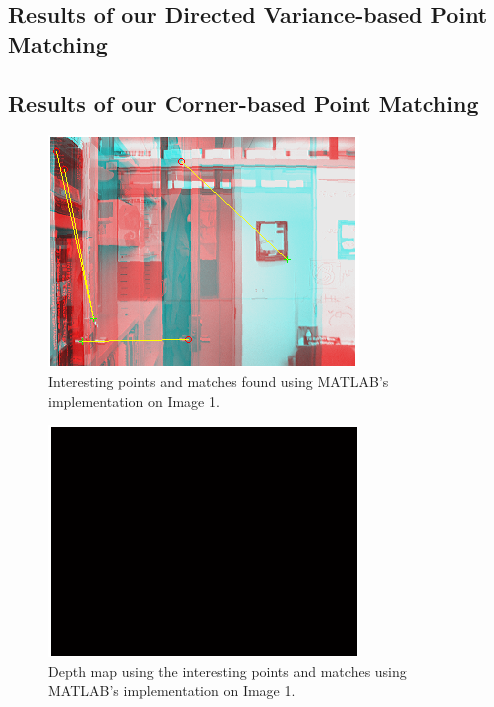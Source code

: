 \subsection{Results of our Directed Variance-based Point Matching}

\subsection{Results of our Corner-based Point Matching}
\begin{figure}[H]\centering
	\includegraphics[width=0.8\linewidth]{Images/01_matlab_match.png}
	\caption{Interesting points and matches found using MATLAB's implementation on Image 1.}
	\label{fig:grid-example}
\end{figure}

\begin{figure}[H]\centering
	\includegraphics[width=0.8\linewidth]{Images/01_matlab_depth.png}
	\caption{Depth map using the interesting points and matches using MATLAB's implementation on Image 1.}
	\label{fig:grid-example}
\end{figure}

